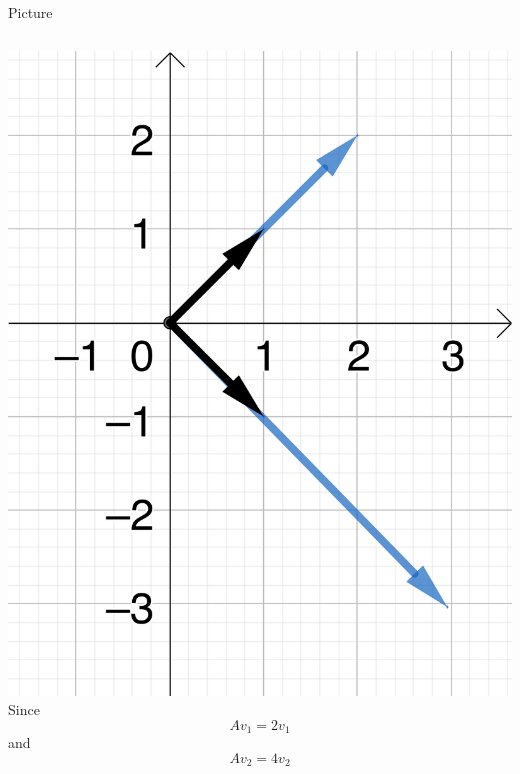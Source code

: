 \documentclass{beamer}
\begin{document}
\begin{frame}{Picture}
\begin{columns}
	\includegraphics{2d-diag.png}
	Since
	\begin{equation*}
		Av_1 = 2v_1
	\end{equation*}
	and
	\begin{equation*}
		Av_2 = 4v_2
	\end{equation*}
\end{columns}
\end{frame}
\end{document}
